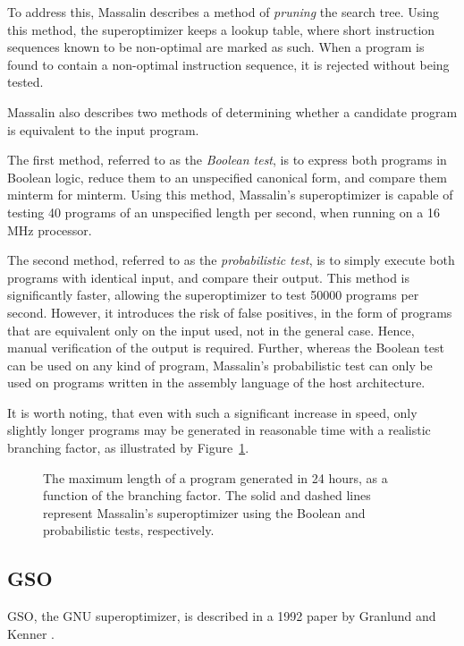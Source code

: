 \documentclass[a4paper,11pt]{kth-mag}
\begin{document}
To address this, Massalin describes a method of \emph{pruning} the search tree.
Using this method, the superoptimizer keeps a lookup table, where short instruction sequences known to be non-optimal are marked as such.
When a program is found to contain a non-optimal instruction sequence, it is rejected without being tested.

Massalin also describes two methods of determining whether a candidate program is equivalent to the input program.

The first method, referred to as the \emph{Boolean test}, is to express both programs in Boolean logic, reduce them to an unspecified canonical form, and compare them minterm for minterm.
Using this method, Massalin's superoptimizer is capable of testing 40 programs of an unspecified length per second, when running on a 16 MHz processor.

The second method, referred to as the \emph{probabilistic test}, is to simply execute both programs with identical input, and compare their output.
This method is significantly faster, allowing the superoptimizer to test 50000 programs per second.
However, it introduces the risk of false positives, in the form of programs that are equivalent only on the input used, not in the general case.
Hence, manual verification of the output is required.
Further, whereas the Boolean test can be used on any kind of program, Massalin's probabilistic test can only be used on programs written in the assembly language of the host architecture.

It is worth noting, that even with such a significant increase in speed, only slightly longer programs may be generated in reasonable time with a realistic branching factor, as illustrated by Figure~\ref{fig:so_program_length}.


\begin{figure}
\centering

\caption{The maximum length of a program generated in 24 hours, as a function of the branching factor.
The solid and dashed lines represent Massalin's superoptimizer using the Boolean and probabilistic tests, respectively.}
\label{fig:so_program_length}
\end{figure}

\subsection{GSO}

GSO, the GNU superoptimizer, is described in a 1992 paper by Granlund and Kenner \cite{granlund92}.
\end{document}

